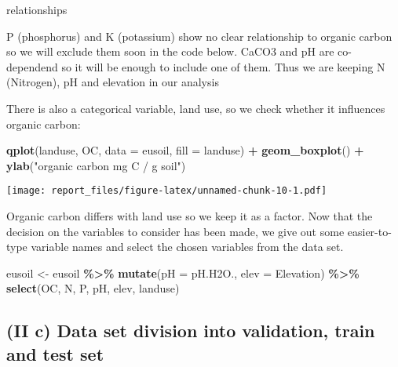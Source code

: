 \documentclass[
]{article}
\newenvironment{Shaded}{\begin{snugshade}}{\end{snugshade}}
\newcommand{\DataTypeTok}[1]{\textcolor[rgb]{0.13,0.29,0.53}{#1}}
\newcommand{\KeywordTok}[1]{\textcolor[rgb]{0.13,0.29,0.53}{\textbf{#1}}}
\newcommand{\NormalTok}[1]{#1}
\newcommand{\OperatorTok}[1]{\textcolor[rgb]{0.81,0.36,0.00}{\textbf{#1}}}
\newcommand{\StringTok}[1]{\textcolor[rgb]{0.31,0.60,0.02}{#1}}
\begin{document}
\begin{Shaded}
\begin{Highlighting}[]
\NormalTok{relationships}
\end{Highlighting}
\end{Shaded}

P (phosphorus) and K (potassium) show no clear relationship to organic
carbon so we will exclude them soon in the code below. CaCO3 and pH are
co-dependend so it will be enough to include one of them. Thus we are
keeping N (Nitrogen), pH and elevation in our analysis

There is also a categorical variable, land use, so we check whether it
influences organic carbon:

\begin{Shaded}
\begin{Highlighting}[]
\KeywordTok{qplot}\NormalTok{(landuse, OC, }\DataTypeTok{data =}\NormalTok{ eusoil, }\DataTypeTok{fill =}\NormalTok{ landuse) }\OperatorTok{+}\StringTok{ }\KeywordTok{geom\_boxplot}\NormalTok{() }\OperatorTok{+}\StringTok{ }
\StringTok{  }\KeywordTok{ylab}\NormalTok{(}\StringTok{"organic carbon mg C / g soil"}\NormalTok{)}
\end{Highlighting}
\end{Shaded}

\texttt{[image: report\_files/figure-latex/unnamed-chunk-10-1.pdf]}

Organic carbon differs with land use so we keep it as a factor. Now that
the decision on the variables to consider has been made, we give out
some easier-to-type variable names and select the chosen variables from
the data set.

\begin{Shaded}
\begin{Highlighting}[]
\NormalTok{eusoil <{-}}\StringTok{ }\NormalTok{eusoil }\OperatorTok{\%>\%}\StringTok{ }\KeywordTok{mutate}\NormalTok{(}\DataTypeTok{pH =}\NormalTok{ pH.H2O., }\DataTypeTok{elev =}\NormalTok{ Elevation) }\OperatorTok{\%>\%}\StringTok{ }
\StringTok{  }\KeywordTok{select}\NormalTok{(OC, N, P, pH, elev, landuse)}
\end{Highlighting}
\end{Shaded}

\hypertarget{ii-c-data-set-division-into-validation-train-and-test-set}{%
\subsection{(II c) Data set division into validation, train and test
set}\label{ii-c-data-set-division-into-validation-train-and-test-set}}
\end{document}
